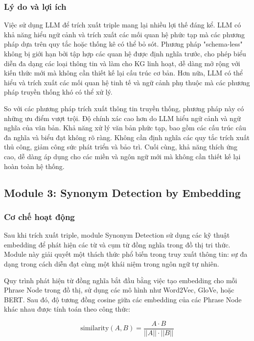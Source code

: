 \subsubsection{Lý do và lợi ích}
Việc sử dụng LLM để trích xuất triple mang lại nhiều lợi thế đáng kể. LLM có khả năng hiểu ngữ cảnh và trích xuất các mối quan hệ phức tạp mà các phương pháp dựa trên quy tắc hoặc thống kê có thể bỏ sót. Phương pháp "schema-less" không bị giới hạn bởi tập hợp các quan hệ được định nghĩa trước, cho phép biểu diễn đa dạng các loại thông tin và làm cho KG linh hoạt, dễ dàng mở rộng với kiến thức mới mà không cần thiết kế lại cấu trúc cơ bản. Hơn nữa, LLM có thể hiểu và trích xuất các mối quan hệ tinh tế và ngữ cảnh phụ thuộc mà các phương pháp truyền thống khó có thể xử lý.

So với các phương pháp trích xuất thông tin truyền thống, phương pháp này có những ưu điểm vượt trội. Độ chính xác cao hơn do LLM hiểu ngữ cảnh và ngữ nghĩa của văn bản. Khả năng xử lý văn bản phức tạp, bao gồm các cấu trúc câu đa nghĩa và biểu đạt không rõ ràng. Không cần định nghĩa các quy tắc trích xuất thủ công, giảm công sức phát triển và bảo trì. Cuối cùng, khả năng thích ứng cao, dễ dàng áp dụng cho các miền và ngôn ngữ mới mà không cần thiết kế lại hoàn toàn hệ thống.

\subsection{Module 3: Synonym Detection by Embedding}

\subsubsection{Cơ chế hoạt động}
Sau khi trích xuất triple, module Synonym Detection sử dụng các kỹ thuật embedding để phát hiện các từ và cụm từ đồng nghĩa trong đồ thị tri thức. Module này giải quyết một thách thức phổ biến trong truy xuất thông tin: sự đa dạng trong cách diễn đạt cùng một khái niệm trong ngôn ngữ tự nhiên.

Quy trình phát hiện từ đồng nghĩa bắt đầu bằng việc tạo embedding cho mỗi Phrase Node trong đồ thị, sử dụng các mô hình như Word2Vec, GloVe, hoặc BERT. Sau đó, độ tương đồng cosine giữa các embedding của các Phrase Node khác nhau được tính toán theo công thức:

\begin{equation}
\text{similarity}(A, B) = \frac{A \cdot B}{||A|| \cdot ||B||}
\end{equation}

